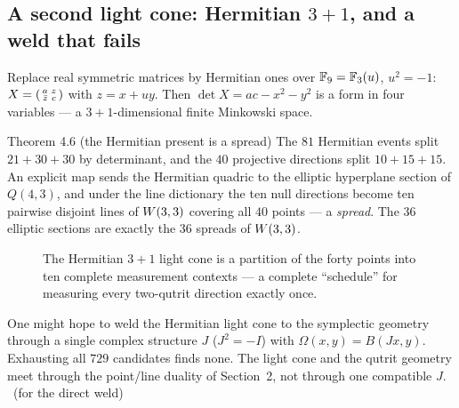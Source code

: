 \subsection{A second light cone: Hermitian $3+1$, and a weld that fails}

Replace real symmetric matrices by Hermitian ones over $\mathbb{F}_9=\mathbb{F}_3(u)$, $u^2=-1$:
$X=\begin{psmallmatrix} a&z\\ \bar z&c\end{psmallmatrix}$ with $z=x+uy$. Then
$\det X=ac-x^2-y^2$ is a form in four variables --- a $3+1$-dimensional finite Minkowski
space.

\begin{result}{Theorem 4.6 (the Hermitian present is a spread) \hfill \tierC}
The $81$ Hermitian events split $21+30+30$ by determinant, and the $40$ projective
directions split $10+15+15$. An explicit map sends the Hermitian quadric to the elliptic
hyperplane section of $Q(4,3)$, and under the line dictionary the ten null directions
become ten pairwise disjoint lines of $W(3,3)$ covering all $40$ points --- a \emph{spread}.
The $36$ elliptic sections are exactly the $36$ spreads of $W(3,3)$.
\end{result}

\begin{figure}[htbp]
\centering
{}
\caption{The Hermitian $3+1$ light cone is a partition of the forty points into ten
complete measurement contexts --- a complete ``schedule'' for measuring every
two-qutrit direction exactly once.}
\label{fig:spread}
\end{figure}

\begin{boundary}
One might hope to weld the Hermitian light cone to the symplectic geometry through a
single complex structure $J$ ($J^2=-I$) with $\Omega(x,y)=B(Jx,y)$. Exhausting all
$729$ candidates finds none. The light cone and the qutrit geometry meet through the
point/line duality of Section~2, not through one compatible $J$. \tierX\ (for the direct weld)
\end{boundary}

